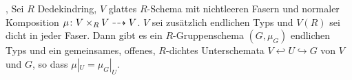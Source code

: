 \documentclass[german]{scrreprt}
\begin{document}
\begin{Satz}\label{thm:weil}
  \cite[Theorem VIII.1.12]{artin},
  \cite[Theorem IV.6.9]{silverman2}
  Sei $R$ Dedekindring, $V$ glattes $R$-Schema mit nichtleeren Fasern
  und normaler Komposition $\mu\colon V\times_R V\dashrightarrow V$.
  $V$ sei zusätzlich endlichen Typs und $V(R)$ sei dicht in jeder
  Faser.
  Dann gibt es ein $R$-Gruppenschema $(G,\mu_G)$ endlichen Typs und
  ein gemeinsames, offenes, $R$-dichtes Unterschemata $V\hookleftarrow
  U\hookrightarrow G$ von $V$ und $G$, so dass $\mu|_U=\mu_G|_U$.
\end{Satz}
\end{document}
